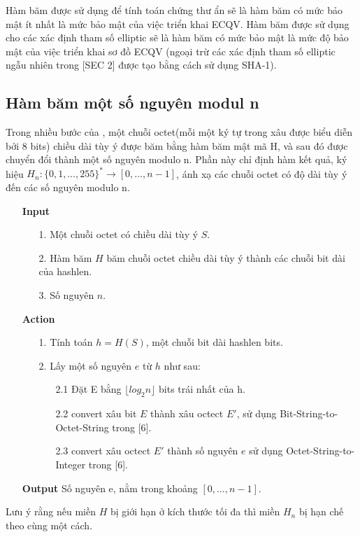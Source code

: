\documentclass[a4paper,12pt]{report}
\begin{document}
Hàm băm được sử dụng để tính toán chứng thư ẩn sẽ là hàm băm có mức bảo mật ít nhất là mức bảo mật của việc triển khai ECQV. Hàm băm được sử dụng cho các xác định tham số  elliptic sẽ là hàm băm có mức bảo mật là mức độ bảo mật của việc triển khai sơ đồ ECQV (ngoại trừ các xác định tham số elliptic ngẫu nhiên trong [SEC 2] được tạo bằng cách sử dụng SHA-1).
\subsection*{Hàm băm một số nguyên modul n}
Trong nhiều bước của , một chuỗi octet(mỗi một ký tự trong xâu được biểu diễn bởi 8 bits) chiều dài tùy ý được băm bằng hàm băm mật mã H, và sau đó được chuyển đổi thành một số nguyên modulo n. Phần này chỉ định hàm kết quả, ký hiệu $H_n: \{0, 1,\ldots , 255\}^{*} \rightarrow [0,\ldots , n - 1]$, ánh xạ các chuỗi octet có độ dài tùy ý đến các số nguyên modulo n.
\begin{itemize}
\item[] \textbf{Input}
\begin{itemize}
\item[1. ] Một chuỗi octet có chiều dài tùy ý $S$.
\item[2. ] Hàm băm $H$ băm chuỗi octet chiều dài tùy ý thành các chuỗi bit dài của hashlen.
\item[3. ] Số nguyên $n$.
\end{itemize}
\item[] \textbf{Action}
\begin{itemize}
\item[1. ] Tính toán $h = H(S)$, một chuỗi bit dài hashlen bits.
\item[2. ] Lấy một số nguyên $e$ từ $h$ như sau:
\begin{itemize}
\item[2.1 ] Đặt E bằng $\lfloor log_2{n} \rfloor$ bits trái nhất của h.
\item[2.2 ] convert xâu bit $E$ thành xâu octect $E'$, sử dụng  Bit-String-to-Octet-String trong [6].
\item[2.3 ] convert xâu octect $E'$ thành số nguyên $e$ sử dụng Octet-String-to-Integer trong [6].
\end{itemize}
\end{itemize}
\item[] \textbf{Output} Số nguyên e, nằm trong khoảng $[0,\ldots , n - 1]$.
\end{itemize}
Lưu ý rằng nếu miền $H$ bị giới hạn ở kích thước tối đa thì miền $H_n$ bị hạn chế theo cùng một cách. 
\end{document}

